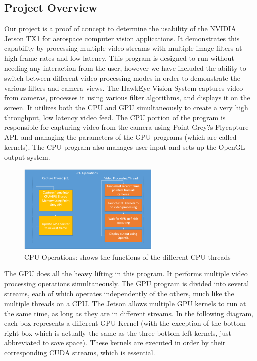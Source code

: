 \subsection{Project Overview}
Our project is a proof of concept to determine the usability of the NVIDIA Jetson TX1 for aerospace computer vision applications.  It demonstrates this capability by processing multiple video streams with multiple image filters at high frame rates and low latency. This program is designed to run without needing any interaction from the user, however we have included the ability to switch between different video processing modes in order to demonstrate the various filters and camera views.
The HawkEye Vision System captures video from cameras, processes it using various filter algorithms, and displays it on the screen. It utilizes both the CPU and GPU simultaneously to create a very high throughput, low latency video feed. The CPU portion of the program is responsible for capturing video from the camera using Point Grey?s Flycapture API, and managing the parameters of the GPU programs (which are called kernels). The CPU program also manages user input and sets up the OpenGL output system. 

\begin{figure}[H] 
	\centering
	\includegraphics[width=0.6\textwidth,natwidth=610,natheight=642]{images/CPU.png} 
	\caption{CPU Operations: shows the functions of the different CPU threads}  
	\end{figure}
	
The GPU does all the heavy lifting in this program. It performs multiple video processing operations simultaneously. The GPU program is divided into several streams, each of which operates independently of the others, much like the multiple threads on a CPU. The Jetson allows multiple GPU kernels to run at the same time, as long as they are in different streams.
In the following diagram, each box represents a different GPU Kernel (with the exception of the bottom right box which is actually the same as the three bottom left kernels, just abbreviated to save space). These kernels are executed in order by their corresponding CUDA streams, which is essential. 
	
